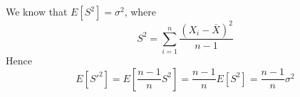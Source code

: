 \documentclass[answers]{exam}
\begin{document}
\begin{questions}

\begin{solution}
    We know that $E[S^2] = \sigma^2$, where
    $$S^2 = \sum_{i=1}^n \frac{(X_i - \overline X)^2}{n-1}$$
    Hence
    $$E[S'^2] = E\left[\frac{n-1}{n}S^2\right] = \frac{n-1}{n} E[S^2] = \frac{n-1}{n}\sigma^2$$
\end{solution}

\end{questions}
\end{document}
